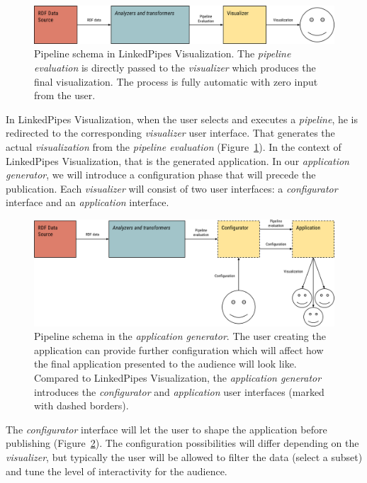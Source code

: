 \begin{figure}
	\centering
	\includegraphics[width=135mm]{img/04_pipeline_scheme_lpv.png}
	\caption{Pipeline schema in LinkedPipes Visualization. The \emph{pipeline evaluation} is directly passed to the \emph{visualizer} which produces the final visualization. The process is fully automatic with zero input from the user.} 
	\label{fig:pipeline-scheme-lpv}
\end{figure}

In LinkedPipes Visualization, when the user selects and executes a \emph{pipeline}, he is redirected to the corresponding \emph{visualizer} user interface. That generates the actual \emph{visualization} from the \emph{pipeline evaluation} (Figure~\ref{fig:pipeline-scheme-lpv}). In the context of LinkedPipes Visualization, that is the generated application. In our \emph{application generator}, we will introduce a configuration phase that will precede the publication. Each \emph{visualizer} will consist of two user interfaces: a \emph{configurator} interface and an \emph{application} interface. 

\begin{figure}
	\centering
	\includegraphics[width=140mm]{img/04_pipeline_scheme_appgen.png}
	\caption{Pipeline schema in the \emph{application generator}. The user creating the application can provide further configuration which will affect how the final application presented to the audience will look like. Compared to LinkedPipes Visualization, the \emph{application generator} introduces the \emph{configurator} and \emph{application} user interfaces (marked with dashed borders).} 
	\label{fig:pipeline-scheme-appgen}
\end{figure}

The \emph{configurator} interface will let the user to shape the application before publishing (Figure~\ref{fig:pipeline-scheme-appgen}). The configuration possibilities will differ depending on the \emph{visualizer}, but typically the user will be allowed to filter the data (select a subset) and tune the level of interactivity for the audience.

